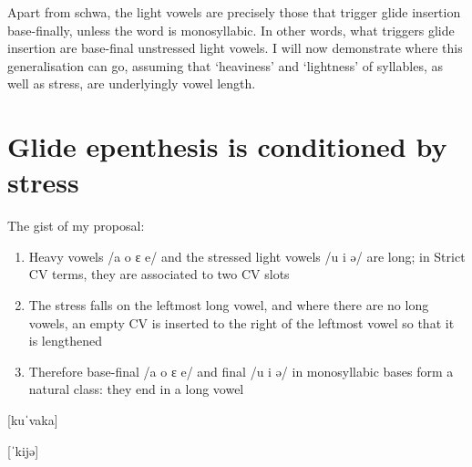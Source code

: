 \documentclass[a4paper, 12pt]{article}
\begin{document}
	\noindent Apart from schwa, the light vowels are precisely those that trigger glide insertion base-finally, unless the word is monosyllabic. In other words, what triggers glide insertion are base-final unstressed light vowels. I will now demonstrate where this generalisation can go, assuming that `heaviness' and `lightness' of syllables, as well as stress, are underlyingly vowel length.
		
		\section{Glide epenthesis is conditioned by stress}\label{sec:proposal}

	The gist of my proposal:
	\begin{enumerate}[$\gg$]
		\item Heavy vowels /a o ɛ e/ and the stressed light vowels /u i ə/ are long; in Strict CV terms, they are associated to two CV slots
		\item The stress falls on the leftmost long vowel, and where there are no long vowels, an empty CV is inserted to the right of the leftmost vowel so that it is lengthened
		\item Therefore base-final /a o ɛ e/ and final /u i ə/ in monosyllabic bases form a natural class: they end in a long vowel
	\end{enumerate}
	
		\begin{minipage}{0.5\linewidth}
			\ex\label{fig:kuvaka} {[kuˈvaka]} \\
			\xe
		\end{minipage}
	\hfill	
		\begin{minipage}{0.4\linewidth}
			\ex\label{fig:kije} {[ˈkijə]} \\
			\xe
		\end{minipage}
		
\end{document}
